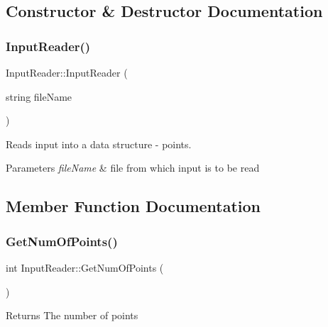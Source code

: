 \subsection{Constructor \& Destructor Documentation}
\mbox{\label{classInputReader_a26f4fba91c54fee7436185f39ab0e4cc}} 
\subsubsection{\texorpdfstring{Input\+Reader()}{InputReader()}}
{\footnotesize\ttfamily Input\+Reader\+::\+Input\+Reader (\begin{DoxyParamCaption}\item[{string}]{file\+Name }\end{DoxyParamCaption})}



Reads input into a data structure -\/ points. 


\begin{DoxyParams}{Parameters}
{\em file\+Name} & file from which input is to be read \\
\hline
\end{DoxyParams}


\subsection{Member Function Documentation}
\mbox{\label{classInputReader_a378297b623a4d8f738af1364e178fa5b}} 
\subsubsection{\texorpdfstring{Get\+Num\+Of\+Points()}{GetNumOfPoints()}}
{\footnotesize\ttfamily int Input\+Reader\+::\+Get\+Num\+Of\+Points (\begin{DoxyParamCaption}{ }\end{DoxyParamCaption})}

\begin{DoxyReturn}{Returns}
The number of points 
\end{DoxyReturn}
\mbox{\label{classInputReader_a1ec15e2c532aeac8fa7583e53a19c737}} 
